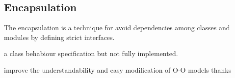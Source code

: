 \subsection{Encapsulation}

The encapsulation is a technique for 
avoid dependencies among 
classes and modules by defining 
strict interfaces. 



 
a class behabiour  specification but not fully implemented.


improve the understandability 
and easy modification of O-O models thanks 
 
